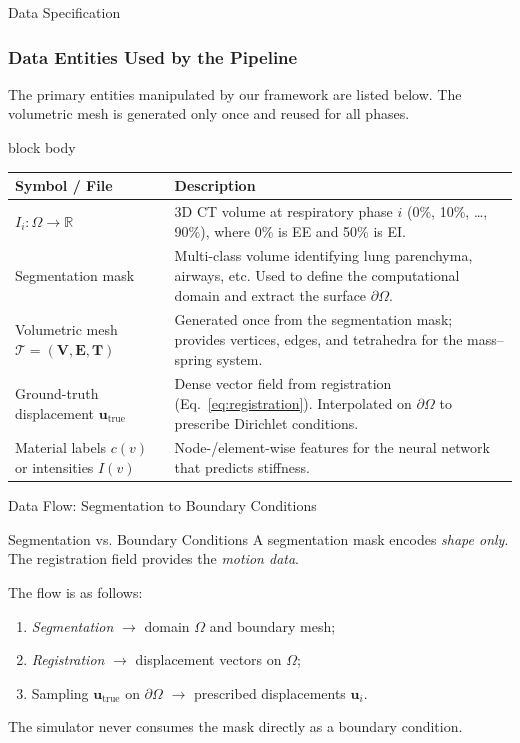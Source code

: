 \documentclass{beamer}
\begin{document}
\begin{frame}[fragile]{Data Specification}
    \frametitle{Data Entities Used by the Pipeline}
    The primary entities manipulated by our framework are listed below. The volumetric mesh is generated only once and reused for all phases.
    \vspace{1em}
    \begin{beamercolorbox}[sep=0.5em]{block body}
    \tiny
    \begin{tabular}{@{}lp{8cm}@{}}
    \toprule
    \textbf{Symbol / File} & \textbf{Description} \\
    \midrule
    $I_i\colon \Omega \to \mathbb{R}$ & 3D CT volume at respiratory phase $i$ (0\%, 10\%, \dots, 90\%), where 0\% is EE and 50\% is EI. \\[1.5em]
    Segmentation mask & Multi-class volume identifying lung parenchyma, airways, etc. Used to define the computational domain and extract the surface $\partial\Omega$. \\[1.5em]
    Volumetric mesh $\mathcal{T}=(\mathbf{V},\mathbf{E},\mathbf{T})$ & Generated once from the segmentation mask; provides vertices, edges, and tetrahedra for the mass–spring system. \\[1.5em]
    Ground-truth displacement $\mathbf{u}_{\mathrm{true}}$ & Dense vector field from registration (Eq.~\eqref{eq:registration}). Interpolated on $\partial\Omega$ to prescribe Dirichlet conditions. \\[1.5em]
    Material labels $c(v)$ or intensities $I(v)$ & Node-/element-wise features for the neural network that predicts stiffness. \\
    \bottomrule
    \end{tabular}
    \end{beamercolorbox}
\end{frame}

\begin{frame}{Data Flow: Segmentation to Boundary Conditions}
    \begin{exampleblock}{Segmentation vs. Boundary Conditions}
    A segmentation mask encodes \emph{shape only}. The registration field provides the \emph{motion data}.
    \end{exampleblock}
    
    The flow is as follows:
    \begin{enumerate}
      \item \emph{Segmentation} $\longrightarrow$ domain $\Omega$ and boundary mesh;
      \item \emph{Registration} $\longrightarrow$ displacement vectors on $\Omega$;
      \item Sampling $\mathbf{u}_{\mathrm{true}}$ on $\partial\Omega$ $\longrightarrow$ prescribed displacements $\mathbf{u}_i$.
    \end{enumerate}
    The simulator never consumes the mask directly as a boundary condition.
\end{frame}
\end{document}
